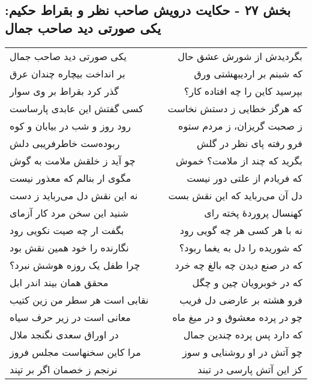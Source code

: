 \begin{center}
\section*{بخش ۲۷ - حکایت درویش صاحب نظر و بقراط حکیم: یکی صورتی دید صاحب جمال}
\label{sec:027}
\begin{longtable}{l p{0.5cm} r}
یکی صورتی دید صاحب جمال
&&
بگردیدش از شورش عشق حال
\\
بر انداخت بیچاره چندان عرق
&&
که شبنم بر اردیبهشتی ورق
\\
گذر کرد بقراط بر وی سوار
&&
بپرسید کاین را چه افتاده کار؟
\\
کسی گفتش این عابدی پارساست
&&
که هرگز خطایی ز دستش نخاست
\\
رود روز و شب در بیابان و کوه
&&
ز صحبت گریزان، ز مردم ستوه
\\
ربوده‌ست خاطرفریبی دلش
&&
فرو رفته پای نظر در گلش
\\
چو آید ز خلقش ملامت به گوش
&&
بگرید که چند از ملامت؟ خموش
\\
مگوی ار بنالم که معذور نیست
&&
که فریادم از علتی دور نیست
\\
نه این نقش دل می‌رباید ز دست
&&
دل آن می‌رباید که این نقش بست
\\
شنید این سخن مرد کار آزمای
&&
کهنسال پروردهٔ پخته رای
\\
بگفت ار چه صیت نکویی رود
&&
نه با هر کسی هر چه گویی رود
\\
نگارنده را خود همین نقش بود
&&
که شوریده را دل به یغما ربود؟
\\
چرا طفل یک روزه هوشش نبرد؟
&&
که در صنع دیدن چه بالغ چه خرد
\\
محقق همان بیند اندر ابل
&&
که در خوبرویان چین و چگل
\\
نقابی است هر سطر من زین کتیب
&&
فرو هشته بر عارضی دل فریب
\\
معانی است در زیر حرف سیاه
&&
چو در پرده معشوق و در میغ ماه
\\
در اوراق سعدی نگنجد ملال
&&
که دارد پس پرده چندین جمال
\\
مرا کاین سخنهاست مجلس فروز
&&
چو آتش در او روشنایی و سوز
\\
نرنجم ز خصمان اگر بر تپند
&&
کز این آتش پارسی در تبند
\\
\end{longtable}
\end{center}
